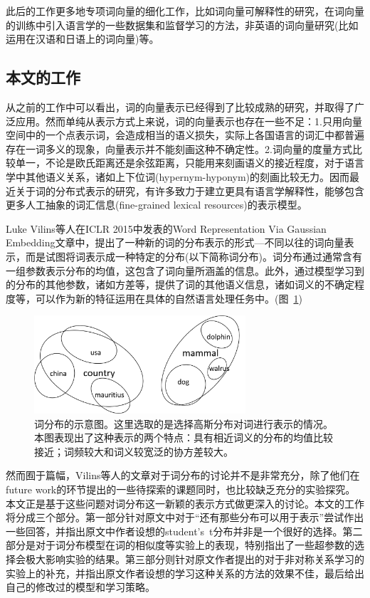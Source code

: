 \documentclass[a4paper,13pt]{article}
\begin{document}
\begin{spacing}{1.5}
此后的工作更多地专项词向量的细化工作，比如词向量可解释性的研究，在词向量的训练中引入语言学的一些数据集和监督学习的方法，非英语的词向量研究(比如运用在汉语和日语上的词向量)等。

\subsection{本文的工作}
从之前的工作中可以看出，词的向量表示已经得到了比较成熟的研究，并取得了广泛应用。然而单纯从表示方式上来说，词的向量表示也存在一些不足：1.只用向量空间中的一个点表示词，会造成相当的语义损失，实际上各国语言的词汇中都普遍存在一词多义的现象，向量表示并不能刻画这种不确定性。2.词向量的度量方式比较单一，不论是欧氏距离还是余弦距离，只能用来刻画语义的接近程度，对于语言学中其他语义关系，诸如上下位词(hypernym-hyponym)的刻画比较无力。因而最近关于词的分布式表示的研究，有许多致力于建立更具有语言学解释性，能够包含更多人工抽象的词汇信息(fine-grained lexical resources)的表示模型。

Luke Vilins等人在ICLR 2015中发表的Word Representation Via Gaussian Embedding\cite{vilnis2014word}文章中，提出了一种新的词的分布表示的形式---不同以往的词向量表示，而是试图将词表示成一种特定的分布(以下简称词分布)。词分布通过通常含有一组参数表示分布的均值，这包含了词向量所涵盖的信息。此外，通过模型学习到的分布的其他参数，诸如方差等，提供了词的其他语义信息，诸如词义的不确定程度等，可以作为新的特征运用在具体的自然语言处理任务中。(图\ \ref{fig:w2d})

\begin{figure}
	\includegraphics[width=0.7\textwidth]{word2gauss_illustrate.png}
	\caption{\wuhao 词分布的示意图。这里选取的是选择高斯分布对词进行表示的情况。本图表现出了这种表示的两个特点：具有相近词义的分布的均值比较接近；词频较大和词义较宽泛的协方差较大。}
	\centering
	\label{fig:w2d}
\end{figure}

然而囿于篇幅，Vilins等人的文章对于词分布的讨论并不是非常充分，除了他们在future work的环节提出的一些待探索的课题同时，也比较缺乏充分的实验探究。本文正是基于这些问题对词分布这一新颖的表示方式做更深入的讨论。本文的工作将分成三个部分。第一部分针对原文中对于“还有那些分布可以用于表示”尝试作出一些回答，并指出原文中作者设想的student's\ t分布并非是一个很好的选择。第二部分是对于词分布模型在词的相似度等实验上的表现，特别指出了一些超参数的选择会极大影响实验的结果。第三部分则针对原文作者提出的对于非对称关系学习的实验上的补充，并指出原文作者设想的学习这种关系的方法的效果不佳，最后给出自己的修改过的模型和学习策略。


\end{spacing}
\end{document}
